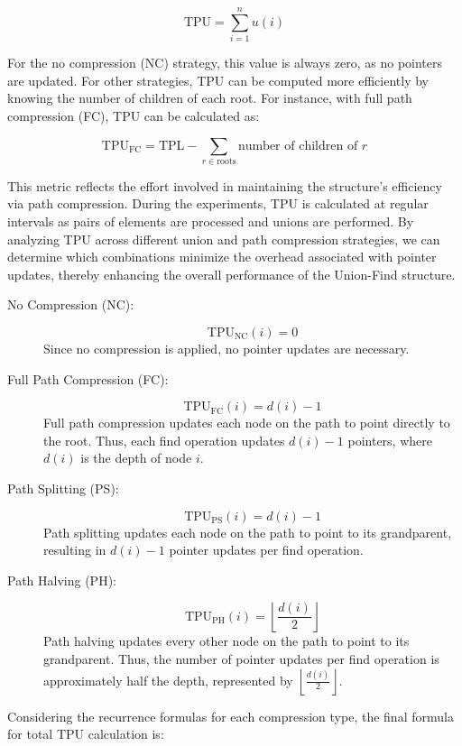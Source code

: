 \documentclass[10pt,a4paper,hidelinks]{article}
\begin{document}
$$\text{TPU} = \sum_{i=1}^{n} u(i)$$

For the no compression (NC) strategy, this value is always zero, as no pointers are updated. For other strategies, TPU can be computed more efficiently by knowing the number of children of each root. For instance, with full path compression (FC), TPU can be calculated as:

$$\text{TPU}_{\text{FC}} = \text{TPL} - \sum_{r \in \text{roots}} \text{number of children of } r$$

This metric reflects the effort involved in maintaining the structure's efficiency via path compression. During the experiments, TPU is calculated at regular intervals as pairs of elements are processed and unions are performed. By analyzing TPU across different union and path compression strategies, we can determine which combinations minimize the overhead associated with pointer updates, thereby enhancing the overall performance of the Union-Find structure.


\begin{description}
    \item[No Compression (NC):]
      \[
      \text{TPU}_{\text{NC}}(i) = 0
      \]
      Since no compression is applied, no pointer updates are necessary.
    
    \item[Full Path Compression (FC):]
      \[
      \text{TPU}_{\text{FC}}(i) = d(i) - 1
      \]
      Full path compression updates each node on the path to point directly to the root. Thus, each find operation updates \( d(i) - 1 \) pointers, where \( d(i) \) is the depth of node \( i \).
    
    \item[Path Splitting (PS):]
      \[
      \text{TPU}_{\text{PS}}(i) = d(i) - 1
      \]
      Path splitting updates each node on the path to point to its grandparent, resulting in \( d(i) - 1 \) pointer updates per find operation.
    
    \item[Path Halving (PH):]
      \[
      \text{TPU}_{\text{PH}}(i) = \left\lfloor \frac{d(i)}{2} \right\rfloor
      \]
      Path halving updates every other node on the path to point to its grandparent. Thus, the number of pointer updates per find operation is approximately half the depth, represented by \( \left\lfloor \frac{d(i)}{2} \right\rfloor \).
\end{description}

Considering the recurrence formulas for each compression type, the final formula for total TPU calculation is:
\end{document}
